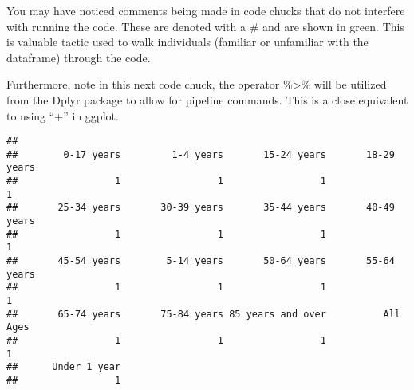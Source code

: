 \documentclass[
]{article}
\newenvironment{Shaded}{\begin{snugshade}}{\end{snugshade}}
\newcommand{\CommentTok}[1]{\textcolor[rgb]{0.56,0.35,0.01}{\textit{#1}}}
\newcommand{\FloatTok}[1]{\textcolor[rgb]{0.00,0.00,0.81}{#1}}
\newcommand{\FunctionTok}[1]{\textcolor[rgb]{0.00,0.00,0.00}{#1}}
\newcommand{\NormalTok}[1]{#1}
\newcommand{\OtherTok}[1]{\textcolor[rgb]{0.56,0.35,0.01}{#1}}
\newcommand{\SpecialCharTok}[1]{\textcolor[rgb]{0.00,0.00,0.00}{#1}}
\newcommand{\StringTok}[1]{\textcolor[rgb]{0.31,0.60,0.02}{#1}}
\begin{document}
You may have noticed comments being made in code chucks that do not
interfere with running the code. These are denoted with a \# and are
shown in green. This is valuable tactic used to walk individuals
(familiar or unfamiliar with the dataframe) through the code.

Furthermore, note in this next code chuck, the operator \%\textgreater\%
will be utilized from the Dplyr package to allow for pipeline commands.
This is a close equivalent to using ``+'' in ggplot.

\begin{Shaded}
\end{Shaded}

\begin{verbatim}
## 
##        0-17 years         1-4 years       15-24 years       18-29 years 
##                 1                 1                 1                 1 
##       25-34 years       30-39 years       35-44 years       40-49 years 
##                 1                 1                 1                 1 
##       45-54 years        5-14 years       50-64 years       55-64 years 
##                 1                 1                 1                 1 
##       65-74 years       75-84 years 85 years and over          All Ages 
##                 1                 1                 1                 1 
##      Under 1 year 
##                 1
\end{verbatim}
\end{document}
